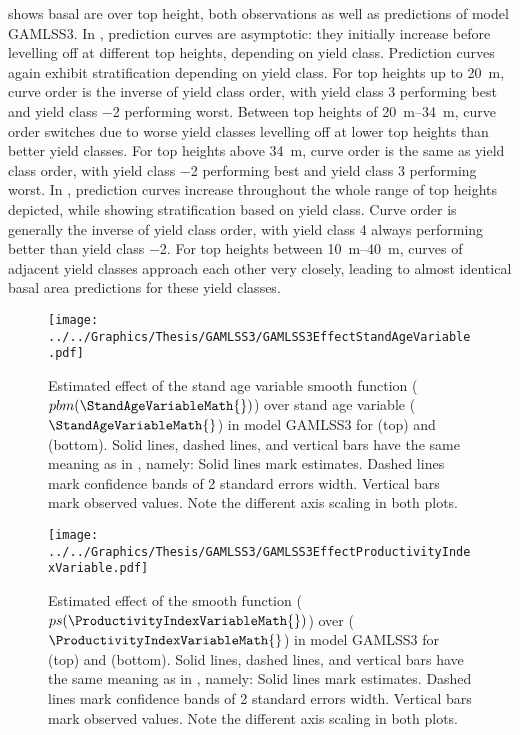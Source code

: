  shows basal are over top height, both observations as well as predictions of model GAMLSS3.  In \Beech{}, prediction curves are asymptotic:  they initially increase before levelling off at different top heights, depending on yield class. Prediction curves again exhibit stratification depending on yield class.   For top heights up to \SI{20}{\meter}, curve order is the inverse of yield class order, with yield class \num{3} performing best and yield class \num{-2} performing worst.  Between top heights of \SIrange{20}{34}{\meter}, curve order switches due to worse yield classes levelling off at lower top heights than better yield classes. For top heights above \SI{34}{\meter}, curve order is the same as yield class order, with yield class \num{-2} performing best and yield class \num{3} performing worst.  In \Spruce{}, prediction curves increase throughout the whole range of top heights depicted, while showing stratification based on yield class.  Curve order is generally the inverse of yield class order, with yield class \num{4} always performing better than yield class \num{-2}.  For top heights between \SIrange{10}{40}{\meter}, curves of adjacent yield classes approach each other very closely, leading to almost identical basal area predictions for these yield classes.

\begin{figure}[h]
  \centering
  \texttt{[image: ../../Graphics/Thesis/GAMLSS3/GAMLSS3EffectStandAgeVariable.pdf]}
  \caption{Estimated effect of the stand age variable smooth function (\(pbm(\StandAgeVariableMath{})\)) over stand age variable (\(\StandAgeVariableMath{}\)) in model GAMLSS3 for \Beech{} (top) and \Spruce{} (bottom).  Solid lines, dashed lines, and vertical bars have the same meaning as in , namely:  Solid lines mark estimates.  Dashed lines mark confidence bands of 2 standard errors width.  Vertical bars mark observed values.  Note the different axis scaling in both plots.}
  \label{fig:GAMLSS3EffectStandAgeVariable}
\end{figure}

\begin{figure}[h]
  \centering
  \texttt{[image: ../../Graphics/Thesis/GAMLSS3/GAMLSS3EffectProductivityIndexVariable.pdf]}
  \caption{Estimated effect of the \ProductivityIndexVariableText{} smooth function (\(ps(\ProductivityIndexVariableMath{})\)) over \ProductivityIndexVariableText{} (\(\ProductivityIndexVariableMath{}\)) in model GAMLSS3 for \Beech{} (top) and \Spruce{} (bottom).  Solid lines, dashed lines, and vertical bars have the same meaning as in , namely:  Solid lines mark estimates.  Dashed lines mark confidence bands of 2 standard errors width.  Vertical bars mark observed values.  Note the different axis scaling in both plots.}
  \label{fig:GAMLSS3EffectProductivityIndexVariable}
\end{figure}

